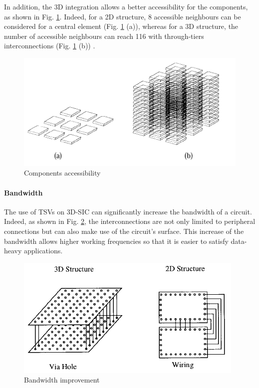 In addition, the 3D integration allows a better accessibility for the components, as shown in Fig. \ref{fig:accessibility}. Indeed, for a 2D structure, 8 accessible neighbours can be considered for a central element (Fig. \ref{fig:accessibility} (a)), whereas for a 3D structure, the number of accessible neighbours can reach 116 with through-tiers interconnections (Fig. \ref{fig:accessibility} (b)) \cite{659500}.

\begin{figure}[h!]
\begin{center}
\includegraphics[width=0.75\linewidth]{accessibility.png}
\end{center}
\vspace{-0.5cm}
\caption{Components accessibility \cite{659500}}
\label{fig:accessibility}
\end{figure}

\paragraph{Bandwidth}

The use of TSVs on 3D-SIC can significantly increase the bandwidth of a circuit. Indeed, as shown in Fig. \ref{fig:bandwidth}, the interconnections are not only limited to peripheral connections but can also make use of the circuit's surface. This increase of the bandwidth allows higher working frequencies so that it is easier to satisfy data-heavy applications.

\begin{figure}[h!]
\begin{center}
\includegraphics[width=0.75\linewidth]{bandwidth.png}
\end{center}
\vspace{-0.5cm}
\caption{Bandwidth improvement \cite{659500}}
\label{fig:bandwidth}
\end{figure}

